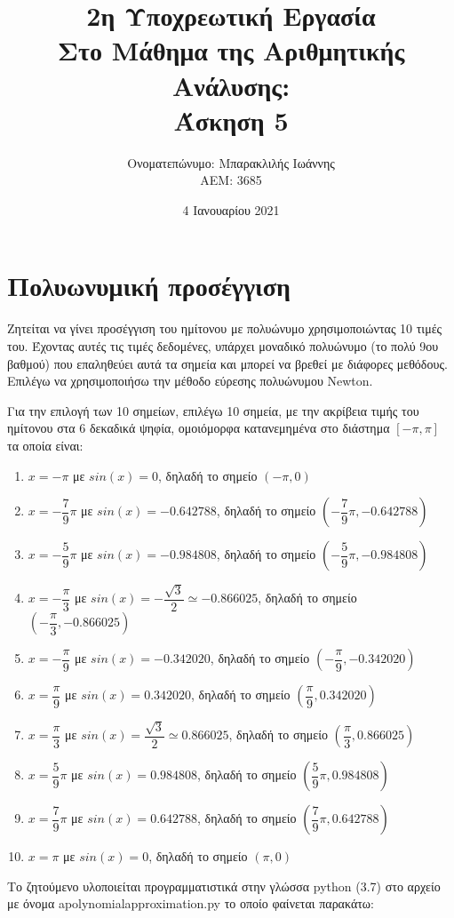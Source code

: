 \documentclass[a4paper,11pt]{article}
\title{2η Υποχρεωτική Εργασία \\ Στο Μάθημα της Αριθμητικής Ανάλυσης: \\ Άσκηση 5}
\author{Ονοματεπώνυμο: Μπαρακλιλής Ιωάννης  \\  ΑΕΜ: 3685}
\date{4 Ιανουαρίου 2021}
\newcommand{\lt}{\latintext}
\newcommand{\gt}{\greektext}
\begin{document}
\maketitle
\section{Πολυωνυμική προσέγγιση}
Ζητείται να γίνει προσέγγιση του ημίτονου με πολυώνυμο χρησιμοποιώντας 10 τιμές του. Έχοντας αυτές τις τιμές δεδομένες, υπάρχει μοναδικό πολυώνυμο (το πολύ 9ου βαθμού) που επαληθεύει αυτά τα σημεία και μπορεί να βρεθεί με διάφορες μεθόδους. Επιλέγω να χρησιμοποιήσω την μέθοδο εύρεσης πολυώνυμου {\lt Newton}.

Για την επιλογή των 10 σημείων, επιλέγω 10 σημεία, με την ακρίβεια τιμής του ημίτονου στα 6 δεκαδικά ψηφία, ομοιόμορφα κατανεμημένα στο διάστημα $[-\pi, \pi]$ τα οποία είναι:
\begin{enumerate}
    \item {\lt $x = -\pi$} με {\lt $sin(x) = 0$}, δηλαδή το σημείο $(-\pi, 0)$
    \item {\lt $x = -\dfrac{7}{9}\pi$} με {\lt $sin(x) = -0.642788$}, δηλαδή το σημείο $(-\dfrac{7}{9}\pi, -0.642788)$
    \item {\lt $x = -\dfrac{5}{9}\pi$} με {\lt $sin(x) = -0.984808$}, δηλαδή το σημείο $(-\dfrac{5}{9}\pi, -0.984808)$
    \item {\lt $x = -\dfrac{\pi}{3}$} με {\lt $sin(x) = -\dfrac{\sqrt{3}}{2} \simeq -0.866025$}, δηλαδή το σημείο $(-\dfrac{\pi}{3}, -0.866025)$
    \item {\lt $x = -\dfrac{\pi}{9}$} με {\lt $sin(x) = -0.342020$}, δηλαδή το σημείο $(-\dfrac{\pi}{9}, -0.342020)$
    \item {\lt $x = \dfrac{\pi}{9}$} με {\lt $sin(x) = 0.342020$}, δηλαδή το σημείο $(\dfrac{\pi}{9}, 0.342020)$
    \item {\lt $x = \dfrac{\pi}{3}$} με {\lt $sin(x) = \dfrac{\sqrt{3}}{2} \simeq 0.866025$}, δηλαδή το σημείο $(\dfrac{\pi}{3}, 0.866025)$
    \item {\lt $x = \dfrac{5}{9}\pi$} με {\lt $sin(x) = 0.984808$}, δηλαδή το σημείο $(\dfrac{5}{9}\pi, 0.984808)$
    \item {\lt $x = \dfrac{7}{9}\pi$} με {\lt $sin(x) = 0.642788$}, δηλαδή το σημείο $(\dfrac{7}{9}\pi, 0.642788)$
    \item {\lt $x = \pi$} με {\lt $sin(x) = 0$}, δηλαδή το σημείο $(\pi, 0)$
\end{enumerate}

Το ζητούμενο υλοποιείται προγραμματιστικά στην γλώσσα {\lt python} (3.7) στο αρχείο με όνομα {\lt a\textunderscore polynomial\textunderscore approximation.py} το οποίο φαίνεται παρακάτω:
\lt

\gt
\end{document}

